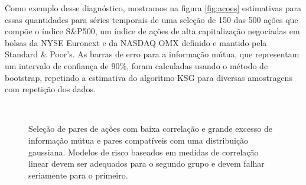 Como exemplo desse diagnóstico, mostramos na figura \ref{fig:acoes} estimativas para essas quantidades para séries temporais de uma seleção de 150 das 500 ações que compõe o índice S\&P500, um índice de ações de alta capitalização negociadas em bolsas da NYSE Euronext e da NASDAQ OMX definido e mantido pela Standard \& Poor's. As barras de erro para a informação mútua, que representam um intervalo de confiança de $90\%$, foram calculadas usando o método de bootstrap, repetindo a estimativa do algoritmo KSG\cite{Kraskov2004} para diversas amostragens com repetição dos dados.
\begin{figure}
 \\
 \caption[Seleção de pares de ações.]{Seleção de pares de ações com baixa correlação e grande excesso de informação mútua e pares compatíveis com uma distribuição gaussiana. Modelos de risco baseados em medidas de correlação linear devem ser adequados para o segundo grupo e devem falhar seriamente para o primeiro.}
 \label{fig:locohimi}
\end{figure}
